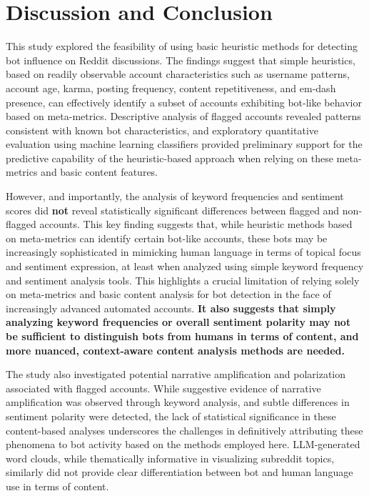 \documentclass[
  12pt,
  letterpaper,
  DIV=11,
  numbers=noendperiod]{scrartcl}
\begin{document}
\section{Discussion and Conclusion}\label{discussion-and-conclusion}

This study explored the feasibility of using basic heuristic methods for
detecting bot influence on Reddit discussions. The findings suggest that
simple heuristics, based on readily observable account characteristics
such as username patterns, account age, karma, posting frequency,
content repetitiveness, and em-dash presence, can effectively identify a
subset of accounts exhibiting bot-like behavior based on meta-metrics.
Descriptive analysis of flagged accounts revealed patterns consistent
with known bot characteristics, and exploratory quantitative evaluation
using machine learning classifiers provided preliminary support for the
predictive capability of the heuristic-based approach when relying on
these meta-metrics and basic content features.

However, and importantly, the analysis of keyword frequencies and
sentiment scores did \textbf{not} reveal statistically significant
differences between flagged and non-flagged accounts. This key finding
suggests that, while heuristic methods based on meta-metrics can
identify certain bot-like accounts, these bots may be increasingly
sophisticated in mimicking human language in terms of topical focus and
sentiment expression, at least when analyzed using simple keyword
frequency and sentiment analysis tools. This highlights a crucial
limitation of relying solely on meta-metrics and basic content analysis
for bot detection in the face of increasingly advanced automated
accounts. \textbf{It also suggests that simply analyzing keyword
frequencies or overall sentiment polarity may not be sufficient to
distinguish bots from humans in terms of content, and more nuanced,
context-aware content analysis methods are needed.}

The study also investigated potential narrative amplification and
polarization associated with flagged accounts. While suggestive evidence
of narrative amplification was observed through keyword analysis, and
subtle differences in sentiment polarity were detected, the lack of
statistical significance in these content-based analyses underscores the
challenges in definitively attributing these phenomena to bot activity
based on the methods employed here. LLM-generated word clouds, while
thematically informative in visualizing subreddit topics, similarly did
not provide clear differentiation between bot and human language use in
terms of content.
\end{document}
